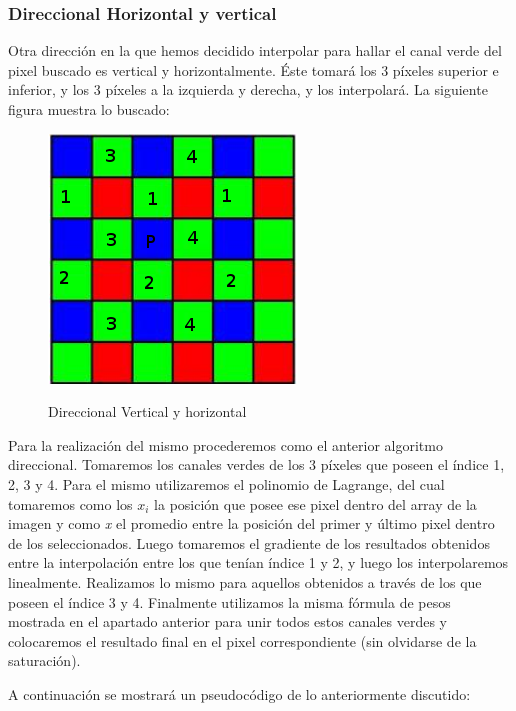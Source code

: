 \documentclass[10pt, a4paper]{article}
\begin{document}
\subsubsection{Direccional Horizontal y vertical}

Otra direcci\'on en la que hemos decidido interpolar para hallar el canal verde del pixel buscado es vertical y horizontalmente. \'Este tomar\'a los 3 p\'ixeles superior e inferior, y los 3 p\'ixeles a la izquierda y derecha, y los interpolar\'a. La siguiente figura muestra lo buscado:
\begin{figure}[H]
\centering
	{\includegraphics[scale=.3]{bayer4}}
	\caption{Direccional Vertical y horizontal} 
\end{figure}

Para la realizaci\'on del mismo procederemos como el anterior algoritmo direccional. Tomaremos los canales verdes de los 3 p\'ixeles que poseen el \'indice 1, 2, 3 y 4. Para el mismo utilizaremos el polinomio de Lagrange, del cual tomaremos como los $x_{i}$ la posici\'on que posee ese pixel dentro del array de la imagen y como \textit{x} el promedio entre la posici\'on del primer y \'ultimo pixel dentro de los seleccionados. Luego tomaremos el gradiente de los resultados obtenidos entre la interpolaci\'on entre los que ten\'ian \'indice 1 y 2, y luego los interpolaremos linealmente. Realizamos lo mismo para aquellos obtenidos a trav\'es de los que poseen el \'indice 3 y 4. Finalmente utilizamos la misma f\'ormula de pesos mostrada en el apartado anterior para unir todos estos canales verdes y colocaremos el resultado final en el pixel correspondiente (sin olvidarse de la saturaci\'on). 

A continuaci\'on se mostrar\'a un pseudoc\'odigo de lo anteriormente discutido:
\end{document}

